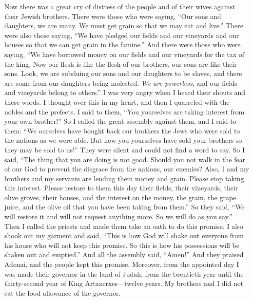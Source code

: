 \begin{biblechapter} %
 Now there was a great cry of distress of the people and of their wives against their Jewish brothers.
\verse There were those who were saying, “Our sons and daughters, we are many. We must get grain so that we may eat and live.”
\verse There were also those saying, “We have pledged our fields and our vineyards and our houses so that we can get grain in the famine.”
\verse And there were those who were saying, “We have borrowed money on our fields and our vineyards for the tax of the king.
\verse Now our flesh is like the flesh of our brothers, our sons are like their sons. Look, we are subduing our sons and our daughters to be slaves, and there are some from our daughters being molested. \textit{We are powerless}, and our fields and vineyards belong to others.”
\verse I was very angry when I heard their shouts and these words.
\verse I thought over this in my heart, and then I quarreled with the nobles and the prefects. I said to them, “You yourselves are taking interest from your own brother!” So I called the great assembly against them,
\verse and I said to them: “We ourselves have bought back our brothers the Jews who were sold to the nations as we were able. But now you yourselves have sold your brothers so they may be sold to us!” They were silent and could not find a word to say.
\verse So I said, “The thing that you are doing is not good. Should you not walk in the fear of our God to prevent the disgrace from the nations, our enemies?
\verse Also, I and my brothers and my servants are lending them money and grain. Please stop taking this interest.
\verse Please restore to them this day their fields, their vineyards, their olive groves, their houses, and the interest on the money, the grain, the grape juice, and the olive oil that you have been taking from them.”
\verse So they said, “We will restore it and will not request anything more. So we will do as you say.” Then I called the priests and made them take an oath to do this promise.
\verse I also shook out my garment and said, “This is how God will shake out everyone from his house who will not keep this promise. So this is how his possessions will be shaken out and emptied.” And all the assembly said, “Amen!” And they praised Adonai, and the people kept this promise.
 Moreover, from the appointed day I was made their governor in the land of Judah, from the twentieth year until the thirty-second year of King Artaxerxes—twelve years. My brothers and I did not eat the food allowance of the governor.

\end{biblechapter}
